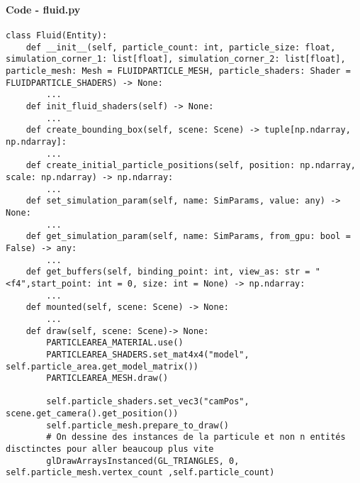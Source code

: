 \begin{frame}
    \frametitle{\anxpti}
    \framesubtitle{}
    
    \centering {\huge \anxpti}
    
    \end{frame}

\begin{frame}[fragile]
    \frametitle{\anxpti}
    \framesubtitle{Code - fluid.py}
    
    \begin{verbatim}
class Fluid(Entity):
    def __init__(self, particle_count: int, particle_size: float, simulation_corner_1: list[float], simulation_corner_2: list[float], particle_mesh: Mesh = FLUIDPARTICLE_MESH, particle_shaders: Shader = FLUIDPARTICLE_SHADERS) -> None:
        ...
    def init_fluid_shaders(self) -> None:
        ...
    def create_bounding_box(self, scene: Scene) -> tuple[np.ndarray, np.ndarray]:
        ...
    def create_initial_particle_positions(self, position: np.ndarray, scale: np.ndarray) -> np.ndarray:
        ...
    def set_simulation_param(self, name: SimParams, value: any) -> None:
        ...
    def get_simulation_param(self, name: SimParams, from_gpu: bool = False) -> any:
        ...
    def get_buffers(self, binding_point: int, view_as: str = "<f4",start_point: int = 0, size: int = None) -> np.ndarray:
        ...
    def mounted(self, scene: Scene) -> None:
        ...
    def draw(self, scene: Scene)-> None:
        PARTICLEAREA_MATERIAL.use()
        PARTICLEAREA_SHADERS.set_mat4x4("model", self.particle_area.get_model_matrix())
        PARTICLEAREA_MESH.draw()

        self.particle_shaders.set_vec3("camPos", scene.get_camera().get_position())
        self.particle_mesh.prepare_to_draw()
        # On dessine des instances de la particule et non n entités disctinctes pour aller beaucoup plus vite
        glDrawArraysInstanced(GL_TRIANGLES, 0, self.particle_mesh.vertex_count ,self.particle_count)

    \end{verbatim}
\end{frame}

